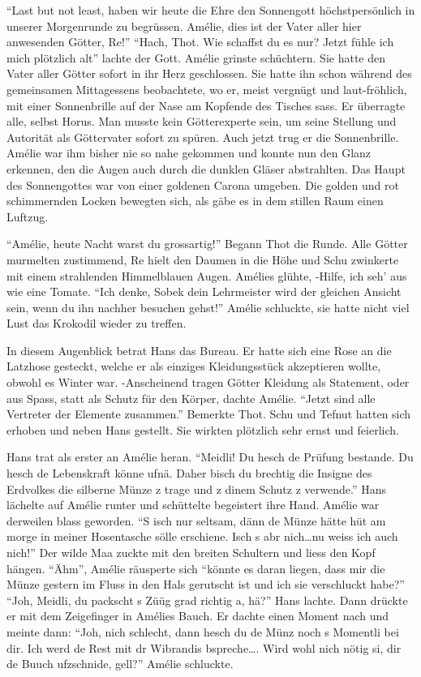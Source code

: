 \documentclass[11pt,titlepage,a5paper]{book}
\begin{document}
"`Last but not least, haben wir heute die Ehre den Sonnengott höchstpersönlich in unserer Morgenrunde zu begrüssen. Amélie, dies ist der Vater aller hier anwesenden Götter, Re!"' "`Hach, Thot. Wie schaffst du es nur? Jetzt fühle ich mich plötzlich alt"' lachte der Gott. Amélie grinste schüchtern. Sie hatte den Vater aller Götter sofort in ihr Herz geschlossen. Sie hatte ihn schon während des gemeinsamen Mittagessens beobachtete, wo er, meist vergnügt und laut-fröhlich, mit einer Sonnenbrille auf der Nase am Kopfende des Tisches sass. Er überragte alle, selbst Horus. Man musste kein Götterexperte sein, um seine Stellung und Autorität als Göttervater sofort zu spüren. Auch jetzt trug er die Sonnenbrille. Amélie war ihm bisher nie so nahe gekommen und konnte nun den Glanz erkennen, den die Augen auch durch die dunklen Gläser abstrahlten. Das Haupt des Sonnengottes war von einer goldenen Carona umgeben. Die golden und rot schimmernden Locken bewegten sich, als gäbe es in dem stillen Raum einen Luftzug. 

"`Amélie, heute Nacht warst du grossartig!"' Begann Thot die Runde. Alle Götter murmelten zustimmend, Re hielt den Daumen in die Höhe und Schu zwinkerte mit einem strahlenden Himmelblauen Augen. Amélies glühte, -Hilfe, ich seh' aus wie eine Tomate. "`Ich denke, Sobek dein Lehrmeister wird der gleichen Ansicht sein, wenn du ihn nachher besuchen gehst!"' Amélie schluckte, sie hatte nicht viel Lust das Krokodil wieder zu treffen. 

In diesem Augenblick betrat Hans das Bureau. Er hatte sich eine Rose an die Latzhose gesteckt, welche er als einziges Kleidungsstück akzeptieren wollte, obwohl es Winter war. -Anscheinend tragen Götter Kleidung als Statement, oder aus Spass, statt als Schutz für den Körper, dachte Amélie. "`Jetzt sind alle Vertreter der Elemente zusammen."' Bemerkte Thot. Schu und Tefnut hatten sich erhoben und neben Hans gestellt. Sie wirkten plötzlich sehr ernst und feierlich. 

Hans trat als erster an Amélie heran. "`Meidli!  Du hesch de Prüfung bestande. Du hesch de Lebenskraft könne ufnä. Daher bisch du brechtig die Insigne des Erdvolkes die silberne Münze z trage und z dinem Schutz z verwende."' Hans lächelte auf Amélie runter und schüttelte begeistert ihre Hand. Amélie war derweilen blass geworden. "`S isch nur seltsam, dänn de Münze hätte hüt am morge in meiner Hosentasche sölle erschiene. Isch s abr nich\dots nu weiss ich auch nich!"' Der wilde Maa zuckte mit den breiten Schultern und liess den Kopf hängen. "`Ähm"', Amélie räusperte sich "`könnte es daran liegen, dass mir die Münze gestern im Fluss in den Hals gerutscht ist und ich sie verschluckt habe?"' "`Joh, Meidli, du packscht s Züüg grad richtig a, hä?"' Hans lachte. Dann drückte er mit dem Zeigefinger in Amélies Bauch. Er dachte einen Moment nach und meinte dann: "`Joh, nich schlecht, dann hesch du de Münz noch s Momentli bei dir. Ich werd de Rest mit dr Wibrandis bspreche\dots. Wird wohl nich nötig si, dir de Buuch ufzschnide, gell?"' Amélie schluckte.
\end{document}
